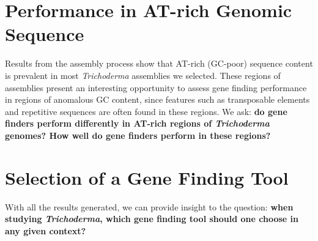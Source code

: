 \section{Performance in AT-rich Genomic Sequence}
\label{rq:anomalous-sequence-content}
Results from the assembly process show that AT-rich (GC-poor) sequence content is prevalent in most \textit{Trichoderma} assemblies we selected. These regions of assemblies present an interesting opportunity to assess gene finding performance
in regions of anomalous GC content, since features such as transposable elements and repetitive sequences are often found in these regions. We ask: \textbf{do gene finders perform differently in AT-rich regions of \textit{Trichoderma} genomes? How well do gene finders perform in these regions?}   

\section{Selection of a Gene Finding Tool}

With all the results generated, we can provide insight to the
question: \textbf{when studying \textit{Trichoderma}, which gene finding tool should one choose in any given context?}
